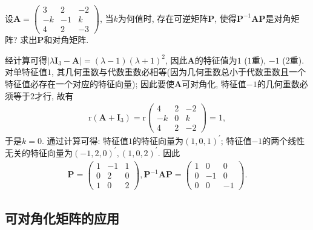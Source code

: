 \documentclass[../../main.tex]{subfiles}
\begin{document}
\begin{example}
设\(\boldsymbol{A}=\begin{pmatrix}
3&2&-2\\
-k&-1&k\\
4&2&-3
\end{pmatrix}\), 当\(k\)为何值时, 存在可逆矩阵\(\boldsymbol{P}\), 使得\(\boldsymbol{P}^{-1}\boldsymbol{AP}\)是对角矩阵? 求出\(\boldsymbol{P}\)和对角矩阵.
\end{example}
\begin{solution}
经计算可得\(\vert\lambda\boldsymbol{I}_{3}-\boldsymbol{A}\vert = (\lambda - 1)(\lambda + 1)^{2}\), 因此\(\boldsymbol{A}\)的特征值为\(1\) (\(1\)重), \(-1\) (\(2\)重). 对单特征值\(1\), 其几何重数与代数重数必相等(因为几何重数总小于代数重数且一个特征值必存在一个对应的特征向量); 因此要使\(\boldsymbol{A}\)可对角化, 特征值\(-1\)的几何重数必须等于\(2\)才行, 故有
\begin{align*}
\mathrm{r}(\boldsymbol{A}+\boldsymbol{I}_{3})=\mathrm{r}\begin{pmatrix}
4&2&-2\\
-k&0&k\\
4&2&-2
\end{pmatrix}=1,
\end{align*}
于是\(k = 0\). 通过计算可得: 特征值\(1\)的特征向量为\((1,0,1)^{\prime}\); 特征值\(-1\)的两个线性无关的特征向量为\((-1,2,0)^{\prime},(1,0,2)^{\prime}\). 因此
\begin{align*}
\boldsymbol{P}=\begin{pmatrix}
1&-1&1\\
0&2&0\\
1&0&2
\end{pmatrix}, \boldsymbol{P}^{-1}\boldsymbol{AP}=\begin{pmatrix}
1&0&0\\
0&-1&0\\
0&0&-1
\end{pmatrix}. 
\end{align*} 
\end{solution}

\subsection{可对角化矩阵的应用}
\end{document}
